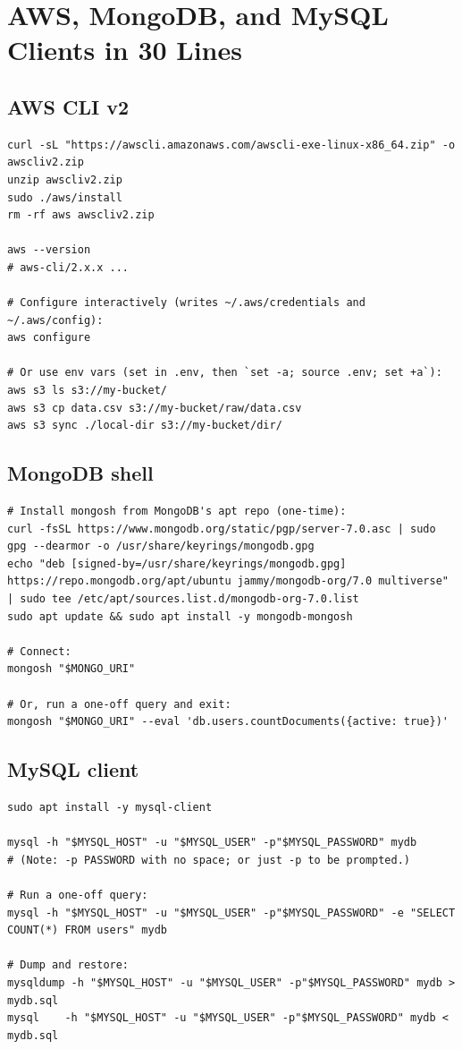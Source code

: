 \documentclass[11pt,a4paper]{article}
\begin{document}
\section{AWS, MongoDB, and MySQL Clients in 30 Lines}

\subsection*{AWS CLI v2}

\begin{lstlisting}[style=bashstyle]
curl -sL "https://awscli.amazonaws.com/awscli-exe-linux-x86_64.zip" -o awscliv2.zip
unzip awscliv2.zip
sudo ./aws/install
rm -rf aws awscliv2.zip

aws --version
# aws-cli/2.x.x ...

# Configure interactively (writes ~/.aws/credentials and ~/.aws/config):
aws configure

# Or use env vars (set in .env, then `set -a; source .env; set +a`):
aws s3 ls s3://my-bucket/
aws s3 cp data.csv s3://my-bucket/raw/data.csv
aws s3 sync ./local-dir s3://my-bucket/dir/
\end{lstlisting}

\subsection*{MongoDB shell}

\begin{lstlisting}[style=bashstyle]
# Install mongosh from MongoDB's apt repo (one-time):
curl -fsSL https://www.mongodb.org/static/pgp/server-7.0.asc | sudo gpg --dearmor -o /usr/share/keyrings/mongodb.gpg
echo "deb [signed-by=/usr/share/keyrings/mongodb.gpg] https://repo.mongodb.org/apt/ubuntu jammy/mongodb-org/7.0 multiverse" | sudo tee /etc/apt/sources.list.d/mongodb-org-7.0.list
sudo apt update && sudo apt install -y mongodb-mongosh

# Connect:
mongosh "$MONGO_URI"

# Or, run a one-off query and exit:
mongosh "$MONGO_URI" --eval 'db.users.countDocuments({active: true})'
\end{lstlisting}

\subsection*{MySQL client}

\begin{lstlisting}[style=bashstyle]
sudo apt install -y mysql-client

mysql -h "$MYSQL_HOST" -u "$MYSQL_USER" -p"$MYSQL_PASSWORD" mydb
# (Note: -p PASSWORD with no space; or just -p to be prompted.)

# Run a one-off query:
mysql -h "$MYSQL_HOST" -u "$MYSQL_USER" -p"$MYSQL_PASSWORD" -e "SELECT COUNT(*) FROM users" mydb

# Dump and restore:
mysqldump -h "$MYSQL_HOST" -u "$MYSQL_USER" -p"$MYSQL_PASSWORD" mydb > mydb.sql
mysql    -h "$MYSQL_HOST" -u "$MYSQL_USER" -p"$MYSQL_PASSWORD" mydb < mydb.sql
\end{lstlisting}
\end{document}
